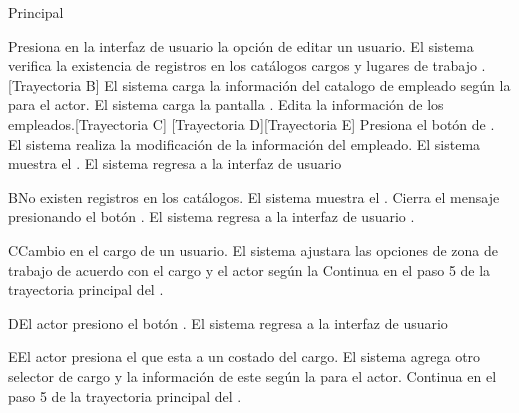 \begin{UCtrayectoria}{Principal}
    
    \UCpaso[\UCactor] Presiona en la interfaz de usuario  la opción de editar un usuario. 
    \UCpaso  El sistema verifica la existencia de registros en los catálogos cargos  y  lugares de trabajo . [Trayectoria B] 
    \UCpaso El sistema carga la información del catalogo de empleado  según la  para el actor.
    \UCpaso El sistema carga la pantalla  .
    \UCpaso[\UCactor] Edita la información de los empleados.[Trayectoria C] [Trayectoria D][Trayectoria E]
    \UCpaso[\UCactor]  Presiona el botón de .
    \UCpaso El sistema realiza la modificación de la información del empleado.
    \UCpaso  El sistema muestra el .    
    \UCpaso El sistema regresa a la interfaz de usuario 
\end{UCtrayectoria}

\begin{UCtrayectoriaA}{B}{No existen registros en los catálogos.}
    \UCpaso     El sistema muestra el .
    \UCpaso[\UCactor] Cierra el mensaje presionando el botón .
    \UCpaso El sistema regresa a la interfaz de usuario .
\end{UCtrayectoriaA}

\begin{UCtrayectoriaA}{C}{Cambio en el cargo de un usuario.}
    \UCpaso     El sistema ajustara las opciones de zona de trabajo de acuerdo con el cargo y el actor según la 
    \UCpaso     Continua en el paso 5 de la trayectoria principal del .
\end{UCtrayectoriaA}

\begin{UCtrayectoriaA}{D}{El actor presiono el botón .}
 \UCpaso El sistema regresa a la interfaz de usuario 
\end{UCtrayectoriaA}
\begin{UCtrayectoriaA}{E}{El actor presiona el \IUbutton{+} que esta a un costado del cargo.}
 \UCpaso El sistema agrega otro selector de cargo y la información de este según la  para el actor.
 \UCpaso Continua en el paso 5 de la trayectoria principal del .
\end{UCtrayectoriaA}

